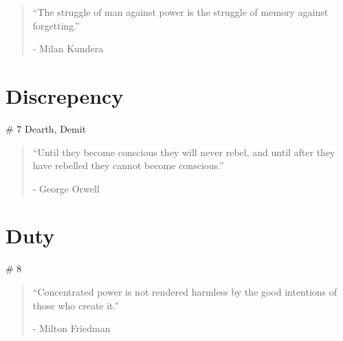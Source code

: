 \vspace{-1.3cm}
\begin{localsize}{10}
	\begin{quote}
		“The struggle of man against power is the struggle of memory against forgetting.”
		\begin{flushright}- Milan Kundera \end{flushright}
	\end{quote} 
\end{localsize}
\vspace{1cm}

\chapter{Discrepency} # 7 Dearth, Demit

\vspace{-1.3cm}
\begin{localsize}{10}
	\begin{quote}
    “Until they become conscious they will never rebel, and until after they have rebelled they cannot become conscious.”
		\begin{flushright}- George Orwell \end{flushright}
	\end{quote} 
\end{localsize}
\vspace{1cm}

\chapter{Duty} # 8

\vspace{-1.3cm}
\begin{localsize}{10}
	\begin{quote}
		“Concentrated power is not rendered harmless by the good intentions of those who create it.” 
		\begin{flushright}- Milton Friedman \end{flushright}
	\end{quote} 
\end{localsize}
\vspace{1cm}

